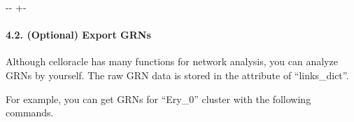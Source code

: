 \documentclass[letterpaper,10pt,english]{sphinxmanual}
\newlength\nbsphinxcodecellspacing
\begin{document}
%
{
\kern-\sphinxverbatimsmallskipamount\kern-\baselineskip
\kern+\FrameHeightAdjust\kern-\fboxrule
\vspace{\nbsphinxcodecellspacing}
%
\begin{sphinxVerbatim}[commandchars=\\\{\}]


\end{sphinxVerbatim}
}
\relax


\paragraph{4.2. (Optional) Export GRNs}
\label{\detokenize{notebooks/04_Network_analysis/Network_analysis_with_with_Paul_etal_2015_data:4.2.-(Optional)-Export-GRNs}}
Although celloracle has many functions for network analysis, you can analyze GRNs by yourself. The raw GRN data is stored in the attribute of “links\_dict”.

For example, you can get GRNs for “Ery\_0” cluster with the following commands.

{
%
\begin{sphinxVerbatim}[commandchars=\\\{\}]
\llap{\color{nbsphinxin}[11]:\,\hspace{\fboxrule}\hspace{\fboxsep}}\PYG{p}{[}\PYG{p}{]}
\end{sphinxVerbatim}
}
\end{document}

